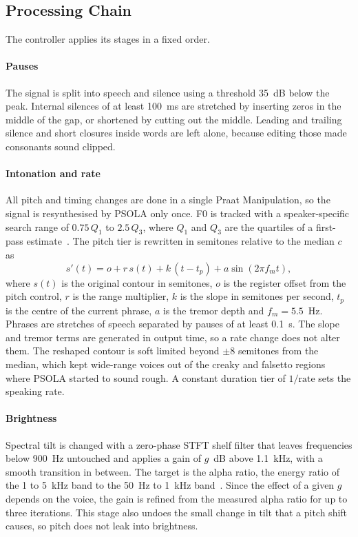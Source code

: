 \documentclass[conference]{IEEEtran}
\begin{document}
\subsection{Processing Chain}
The controller applies its stages in a fixed order.

\paragraph{Pauses} The signal is split into speech and silence using a threshold 35~dB below the
peak. Internal silences of at least 100~ms are stretched by inserting zeros in the middle of the gap,
or shortened by cutting out the middle. Leading and trailing silence and short closures inside
words are left alone, because editing those made consonants sound clipped.

\paragraph{Intonation and rate} All pitch and timing changes are done in a single Praat
Manipulation, so the signal is resynthesised by PSOLA only once. F0 is tracked with a
speaker-specific search range of $0.75\,Q_1$ to $2.5\,Q_3$, where $Q_1$ and $Q_3$ are the quartiles of a
first-pass estimate~\cite{b10}. The pitch tier is rewritten in semitones relative to the median
$c$ as
\begin{equation}
s'(t) = o + r\,s(t) + k\,(t - t_p) + a \sin(2\pi f_m t), \label{eq:tier}
\end{equation}
where $s(t)$ is the original contour in semitones, $o$ is the register offset from the pitch
control, $r$ is the range multiplier, $k$ is the slope in semitones per second, $t_p$ is the centre
of the current phrase, $a$ is the tremor depth and $f_m = 5.5$~Hz. Phrases are stretches of speech
separated by pauses of at least 0.1~s. The slope and tremor terms are generated in output time, so
a rate change does not alter them. The reshaped contour is soft limited beyond $\pm 8$ semitones from
the median, which kept wide-range voices out of the creaky and falsetto regions where PSOLA started
to sound rough. A constant duration tier of $1/\text{rate}$ sets the speaking rate.

\paragraph{Brightness} Spectral tilt is changed with a zero-phase STFT shelf filter that leaves
frequencies below 900~Hz untouched and applies a gain of $g$~dB above 1.1~kHz, with a smooth
transition in between. The target is the alpha ratio, the energy ratio of the 1 to 5~kHz band
to the 50~Hz to 1~kHz band~\cite{b15}. Since the effect of a given $g$ depends on the voice, the gain is
refined from the measured alpha ratio for up to three iterations. This stage also undoes the small
change in tilt that a pitch shift causes, so pitch does not leak into brightness.
\end{document}
